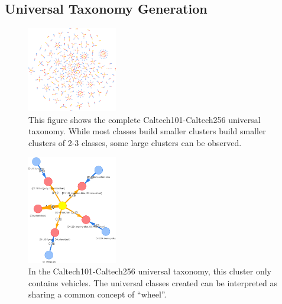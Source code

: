 \subsection{Universal Taxonomy Generation}

\begin{figure}[ht]
      \centering
      \includegraphics[width=0.35\textwidth]{figures/taxonomy.png}

      \caption{This figure shows the complete Caltech101-Caltech256 universal taxonomy.
            While most classes build smaller clusters build smaller clusters of 2-3 classes,
            some large clusters can be observed.}
      \label{fig:taxonomy}
\end{figure}

\begin{figure}[ht]
      \centering
      \includegraphics[width=0.35\textwidth]{figures/wheel_concept.png}

      \caption{In the Caltech101-Caltech256 universal taxonomy,
            this cluster only contains vehicles. The universal classes created can be interpreted as
            sharing a common concept of \enquote{wheel}.}
      \label{fig:wheel_concept}
\end{figure}

